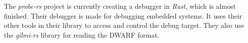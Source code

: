 
The \emph{probe-rs} project is currently creating a debugger in \emph{Rust}, which is almost finished.
Their debugger is made for debugging embedded systems.
It uses their other tools in their library to access and control the debug target.
They also use the \emph{gilmi-rs} library for reading the \gls{DWARF} format.


